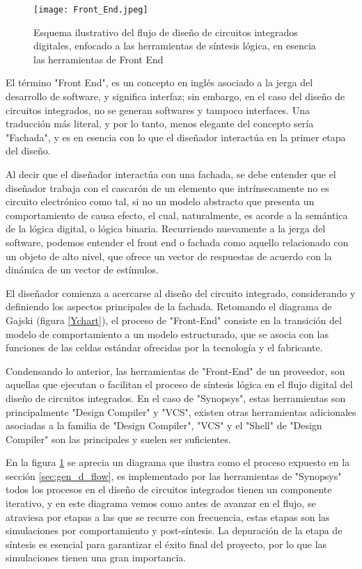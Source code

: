 {\begin{figure}[h]
\texttt{[image: Front\_End.jpeg]}
\centering
\caption{Esquema ilustrativo del flujo de diseño de circuitos integrados digitales, enfocado a las herramientas de síntesis lógica, en esencia las herramientas de Front End}
\label{fe}
\end{figure}


El término "Front End", es un concepto en inglés asociado a la jerga del desarrollo de software, y significa interfaz; sin embargo, en el caso del diseño de circuitos integrados, no se generan softwares y tampoco interfaces. Una traducción más literal, y por lo tanto, menos elegante del concepto sería "Fachada", y es en esencia con lo que el diseñador interactúa en la primer etapa del diseño.

Al decir que el diseñador interactúa con una fachada, se debe entender que el diseñador trabaja con el cascarón de un elemento que intrínsecamente no es circuito electrónico como tal, si no un modelo abstracto que presenta un comportamiento de causa efecto, el cual, naturalmente, es acorde a la semántica de la lógica digital, o lógica binaria. Recurriendo nuevamente a la jerga del software, podemos entender el front end o fachada como aquello relacionado con un objeto de alto nivel, que ofrece un vector de respuestas de acuerdo con la dinámica de un vector de estímulos.

El diseñador comienza a acercarse al diseño del circuito integrado, considerando y definiendo los aspectos principales de la fachada. Retomando el diagrama de Gajski (figura \ref{Ychart}), el proceso de "Front-End" consiste en la transición del modelo de comportamiento a un modelo estructurado, que se asocia con las funciones de las celdas estándar ofrecidas por la tecnología y el fabricante.

Condensando lo anterior, las herramientas de "Front-End" de un proveedor, son aquellas que ejecutan o facilitan el proceso de síntesis lógica en el flujo digital del diseño de circuitos integrados. En el caso de "Synopsys", estas herramientas son principalmente "Design Compiler" y "VCS", existen otras herramientas adicionales asociadas a la familia de "Design Compiler", "VCS" y el "Shell" de "Design Compiler" son las principales y suelen ser suficientes.

En la figura \ref{fe} se aprecia un diagrama que ilustra como el proceso expuesto en la sección \ref{sec:gen_d_flow}, es implementado por las herramientas de "Synopsys" todos los procesos en el diseño de circuitos integrados tienen un componente iterativo, y en este diagrama vemos como antes de avanzar en el flujo, se atraviesa por etapas a las que se recurre con frecuencia, estas etapas son las simulaciones por comportamiento y post-síntesis. La depuración de la etapa de síntesis es esencial para garantizar el éxito final del proyecto, por lo que las simulaciones tienen una gran importancia.

}
